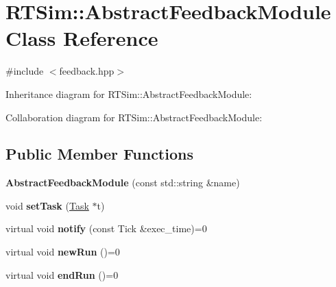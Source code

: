 \hypertarget{classRTSim_1_1AbstractFeedbackModule}{}\section{R\+T\+Sim\+:\+:Abstract\+Feedback\+Module Class Reference}
\label{classRTSim_1_1AbstractFeedbackModule}


{\ttfamily \#include $<$feedback.\+hpp$>$}



Inheritance diagram for R\+T\+Sim\+:\+:Abstract\+Feedback\+Module\+:


Collaboration diagram for R\+T\+Sim\+:\+:Abstract\+Feedback\+Module\+:
\subsection*{Public Member Functions}
\begin{DoxyCompactItemize}
\item 
{\bfseries Abstract\+Feedback\+Module} (const std\+::string \&name)\hypertarget{classRTSim_1_1AbstractFeedbackModule_a6709e3a16d1ef70dcf213e4c644d6cc4}{}\label{classRTSim_1_1AbstractFeedbackModule_a6709e3a16d1ef70dcf213e4c644d6cc4}

\item 
void {\bfseries set\+Task} (\hyperlink{classRTSim_1_1Task}{Task} $\ast$t)\hypertarget{classRTSim_1_1AbstractFeedbackModule_ac0633a8b88341ce83e4aa24def8703f8}{}\label{classRTSim_1_1AbstractFeedbackModule_ac0633a8b88341ce83e4aa24def8703f8}

\item 
virtual void {\bfseries notify} (const Tick \&exec\+\_\+time)=0\hypertarget{classRTSim_1_1AbstractFeedbackModule_aaaedb125cbe3449436ae7c033655f305}{}\label{classRTSim_1_1AbstractFeedbackModule_aaaedb125cbe3449436ae7c033655f305}

\item 
virtual void {\bfseries new\+Run} ()=0\hypertarget{classRTSim_1_1AbstractFeedbackModule_a38fd078b3164eea593ea243d173ad087}{}\label{classRTSim_1_1AbstractFeedbackModule_a38fd078b3164eea593ea243d173ad087}

\item 
virtual void {\bfseries end\+Run} ()=0\hypertarget{classRTSim_1_1AbstractFeedbackModule_ab0deea0d3d8e3e7f1138609db3348296}{}\label{classRTSim_1_1AbstractFeedbackModule_ab0deea0d3d8e3e7f1138609db3348296}

\end{DoxyCompactItemize}
